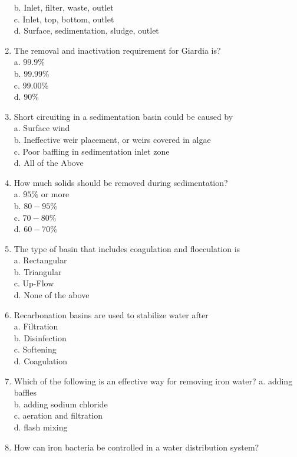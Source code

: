 \begin{enumerate}
b. Inlet, filter, waste, outlet\\
c. Inlet, top, bottom, outlet\\
d. Surface, sedimentation, sludge, outlet\\
\item The removal and inactivation requirement for Giardia is?\\
a. $99.9 \%$\\
b. $99.99 \%$\\
c. $99.00 \%$\\
d. $90 \%$\\
\item Short circuiting in a sedimentation basin could be caused by\\
a. Surface wind\\
b. Ineffective weir placement, or weirs covered in algae\\
c. Poor baffling in sedimentation inlet zone\\
d. All of the Above\\
\item How much solids should be removed during sedimentation?\\
a. $95 \%$ or more\\
b. $80-95 \%$\\
c. $70-80 \%$\\
d. $60-70 \%$\\
\item The type of basin that includes coagulation and flocculation is\\
a. Rectangular\\
b. Triangular\\
c. Up-Flow\\
d. None of the above\\
\item Recarbonation basins are used to stabilize water after\\
a. Filtration\\
b. Disinfection\\
c. Softening\\
d. Coagulation\\
\item Which of the following is an effective way for removing iron water? a. adding baffles\\
b. adding sodium chloride\\
c. aeration and filtration\\
d. flash mixing\\
\item How can iron bacteria be controlled in a water distribution system?\\

\end{enumerate}
